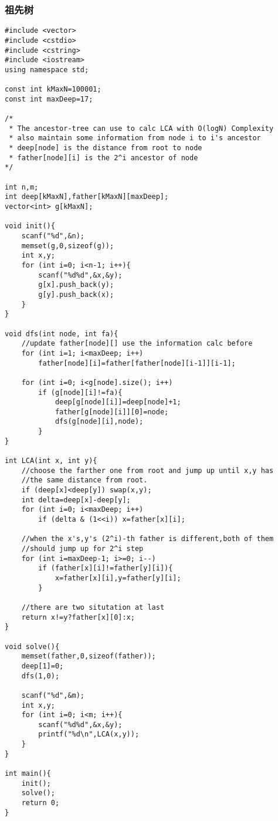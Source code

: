 \subsubsection{祖先树}
\begin{verbatim}
#include <vector>
#include <cstdio>
#include <cstring>
#include <iostream>
using namespace std;

const int kMaxN=100001;
const int maxDeep=17;

/*
 * The ancestor-tree can use to calc LCA with O(logN) Complexity
 * also maintain some information from node i to i's ancestor
 * deep[node] is the distance from root to node
 * father[node][i] is the 2^i ancestor of node
*/

int n,m;
int deep[kMaxN],father[kMaxN][maxDeep];
vector<int> g[kMaxN];

void init(){
    scanf("%d",&n);
    memset(g,0,sizeof(g));
    int x,y;
    for (int i=0; i<n-1; i++){
        scanf("%d%d",&x,&y);
        g[x].push_back(y);
        g[y].push_back(x);
    }
}

void dfs(int node, int fa){
    //update father[node][] use the information calc before
    for (int i=1; i<maxDeep; i++) 
        father[node][i]=father[father[node][i-1]][i-1];

    for (int i=0; i<g[node].size(); i++)
        if (g[node][i]!=fa){
            deep[g[node][i]]=deep[node]+1;
            father[g[node][i]][0]=node;
            dfs(g[node][i],node);
        }
}

int LCA(int x, int y){
    //choose the farther one from root and jump up until x,y has 
    //the same distance from root.
    if (deep[x]<deep[y]) swap(x,y);
    int delta=deep[x]-deep[y];
    for (int i=0; i<maxDeep; i++)
        if (delta & (1<<i)) x=father[x][i];

    //when the x's,y's (2^i)-th father is different,both of them
    //should jump up for 2^i step
    for (int i=maxDeep-1; i>=0; i--)
        if (father[x][i]!=father[y][i]){
            x=father[x][i],y=father[y][i];
        }

    //there are two situtation at last
    return x!=y?father[x][0]:x;
}

void solve(){
    memset(father,0,sizeof(father));
    deep[1]=0;
    dfs(1,0);

    scanf("%d",&m);
    int x,y;
    for (int i=0; i<m; i++){
        scanf("%d%d",&x,&y);
        printf("%d\n",LCA(x,y));
    }
}

int main(){
    init();
    solve();
    return 0;
}
\end{verbatim}
